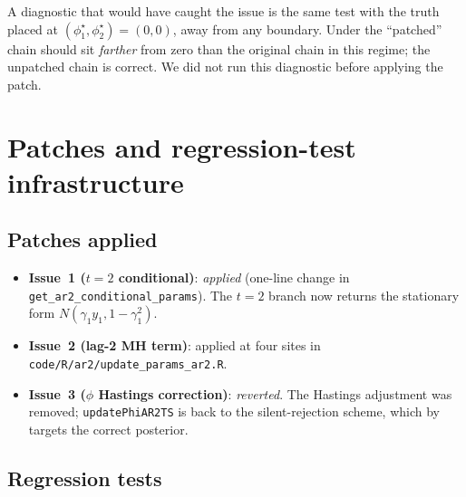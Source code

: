 \documentclass[11pt]{article}
\theoremstyle{plain}
\theoremstyle{definition}
\theoremstyle{remark}
\begin{document}
A diagnostic that would have caught the issue is the same test with the
truth placed at $(\phi_1^\star, \phi_2^\star) = (0, 0)$, away from any
boundary. Under  the ``patched'' chain should sit
\emph{farther} from zero than the original chain in this regime; the
unpatched chain is correct. We did not run this diagnostic before
applying the patch.

\section{Patches and regression-test infrastructure}\label{sec:patches}

\subsection{Patches applied}\label{sec:patches-applied}

\begin{itemize}
  \item \textbf{Issue~1 ($t = 2$ conditional)}: \emph{applied} (one-line
        change in \texttt{get\_ar2\_conditional\_params}). The $t = 2$
        branch now returns the stationary form
        $N(\gamma_1 y_1, 1 - \gamma_1^2)$.
  \item \textbf{Issue~2 (lag-2 MH term)}: applied at four sites in
        \texttt{code/R/ar2/update\_params\_ar2.R}.
  \item \textbf{Issue~3 ($\phi$ Hastings correction)}: \emph{reverted}.
        The Hastings adjustment was removed; \texttt{updatePhiAR2TS} is
        back to the silent-rejection scheme, which by 
        targets the correct posterior.
\end{itemize}

\subsection{Regression tests}\label{sec:tests}
\end{document}
